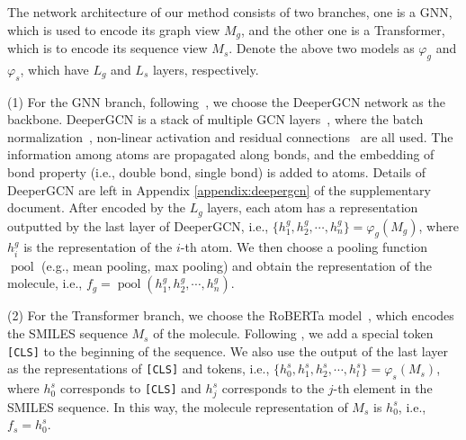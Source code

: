 \documentclass{article}
\begin{document}
The network architecture of our method consists of two branches, one is a GNN, which is used to encode its graph view $M_g$, and the other one is a Transformer, which is to encode its sequence view $M_s$. Denote the above two models as $\varphi_g$ and $\varphi_s$, which have $L_g$ and $L_s$ layers, respectively.

\noindent(1) For the GNN branch, following~\cite{li2020deepergcn}, we choose the DeeperGCN network as the backbone. DeeperGCN is a stack of multiple GCN layers~\cite{kipf2016semi}, where the batch normalization~\cite{ioffe2015batch}, non-linear activation and residual connections~\cite{he2016deep} are all used. The information among atoms are propagated along bonds, and the embedding of bond property (i.e., double bond, single bond) is added to atoms. Details of DeeperGCN are left in Appendix \ref{appendix:deepergcn} of the supplementary document. After encoded by the $L_g$ layers, each atom has a representation outputted by the last layer of DeeperGCN, i.e., $\{h^g_1,h^g_2,\cdots,h^g_n\}=\varphi_g(M_g)$, where $h^g_i$ is the representation of the $i$-th atom. We then choose a pooling function $\operatorname{pool}$ (e.g., mean pooling, max pooling) and obtain the representation of the molecule, i.e., $f_g=\operatorname{pool}(h^g_1,h^g_2,\cdots,h^g_n)$. 

\noindent(2) For the Transformer branch, we choose the RoBERTa model~\cite{liu2019roberta}, which encodes the SMILES sequence $M_s$ of the molecule. Following \cite{liu2019roberta,devlin2018bert}, we add a special token \texttt{[CLS]} to the beginning of the sequence. We also use the output of the last layer as the representations of \texttt{[CLS]} and tokens, i.e., $\{h^s_0,h^s_1,h^s_2,\cdots,h^s_l\}=\varphi_s(M_s)$, where $h^s_0$ corresponds to \texttt{[CLS]} and $h^s_j$ corresponds to the $j$-th element in the SMILES sequence. In this way, the molecule representation of $M_s$ is $h^s_0$, i.e., $f_s=h^s_0$.





\iffalse
For a fair comparison, we use the similar backbone architecture for each branch without much modification. Specifically, for Transformer branch, we use the same architecture as RoBERTa \cite{liu2019roberta}, consisting of $L$ layer of Transformer encoder \cite{vaswani2017attention}, to map $m_s$, a sequence of discrete tokens into a sequence of continuous representation $f_s$. Following prior work, we append a \texttt{[CLS]} token to represent the sequence representation $h_s$ when pre-training and finetuning . For GNN branch, to match the depth of Transformer branch, following DeeperGCN \cite{li2020deepergcn}, we stack the same $L$ layer of GNN block by introducing the residual connection. The GNN transforms the graph view $m_g$, consisting of atoms and bonds into a set of node embeddings $f_g$. Last, we pool the node embeddings to get graph embedding $h_g=\operatorname{Pool}(f_g)$. 
\fi
\end{document}
